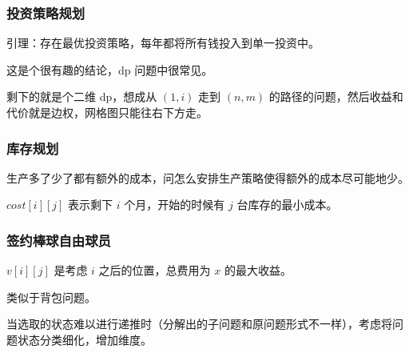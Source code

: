 \subsubsection{投资策略规划}

\begin{QUOTE}{}{}
引理：存在最优投资策略，每年都将所有钱投入到单一投资中。
\end{QUOTE}

这是个很有趣的结论，dp 问题中很常见。

\href{https://fogsail.github.io/2017/05/08/20170508/}{}

剩下的就是个二维 dp，想成从 $(1, i)$ 走到 $(n, m)$ 的路径的问题，然后收益和代价就是边权，网格图只能往右下方走。

\subsubsection{库存规划}

生产多了少了都有额外的成本，问怎么安排生产策略使得额外的成本尽可能地少。

$cost[i][j]$ 表示剩下 $i$ 个月，开始的时候有 $j$ 台库存的最小成本。

\href{https://walkccc.github.io/CLRS/Chap15/Problems/15-11/}{}

\subsubsection{签约棒球自由球员}

$v[i][j]$ 是考虑 $i$ 之后的位置，总费用为 $x$ 的最大收益。

\href{https://walkccc.github.io/CLRS/Chap15/Problems/15-12/}{}

类似于背包问题。

\hr

当选取的状态难以进行递推时（分解出的子问题和原问题形式不一样），考虑将问题状态分类细化，增加维度。
